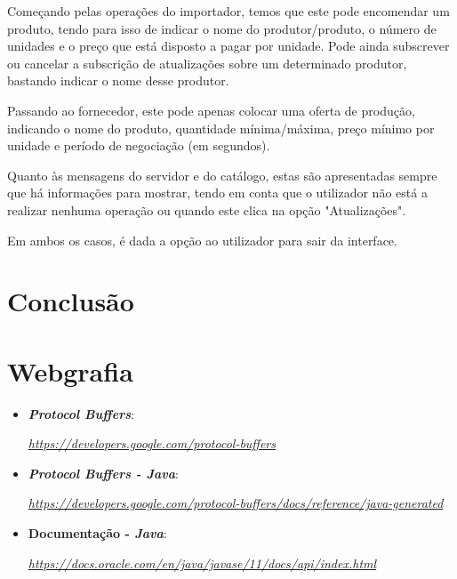 \documentclass[a4paper]{report}
\begin{document}
	Começando pelas operações do importador, temos que este pode encomendar um produto, tendo para isso de indicar o nome do produtor/produto, o número de unidades e o preço que está disposto a pagar por unidade. Pode ainda subscrever ou cancelar a subscrição de atualizações sobre um determinado produtor, bastando indicar o nome desse produtor.
	
	Passando ao fornecedor, este pode apenas colocar uma oferta de produção, indicando o nome do produto, quantidade mínima/máxima, preço mínimo por unidade e período de negociação (em segundos).
	
	Quanto às mensagens do servidor e do catálogo, estas são apresentadas sempre que há informações para mostrar, tendo em conta que o utilizador não está a realizar nenhuma operação ou quando este clica na opção "Atualizações".
	
	Em ambos os casos, é dada a opção ao utilizador para sair da interface.
\chapter{Conclusão}

\chapter{Webgrafia}
	\begin{itemize}
		\item \textbf{\textit{Protocol Buffers}}:
		\par \textit{\url{https://developers.google.com/protocol-buffers}}
        \item \textbf{\textit{Protocol Buffers - Java}}:
		\par \textit{\url{https://developers.google.com/protocol-buffers/docs/reference/java-generated}}
		\item \textbf{Documentação - \textit{Java}}:
		\par \textit{\url{https://docs.oracle.com/en/java/javase/11/docs/api/index.html}}
    \end{itemize}
\end{document}

